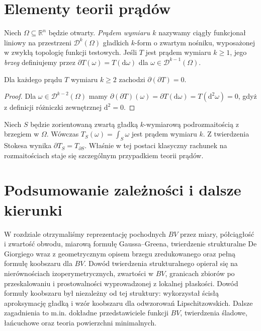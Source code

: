 \section{Elementy teorii prądów}
\begin{definicja}
\label{def:current-29}
Niech $\Omega\subseteq\mathbb R^n$ będzie otwarty.
\emph{Prądem wymiaru $k$} nazywamy ciągły
funkcjonał liniowy na przestrzeni $\mathcal D^k(\Omega)$
gładkich $k$-form o zwartym nośniku, wyposażonej
w zwykłą topologię funkcji testowych.
Jeśli $T$ jest prądem wymiaru $k\ge1$, jego
\emph{brzeg} definiujemy przez
$\partial T(\omega)=T(\mathrm d\omega)$
dla $\omega\in\mathcal D^{k-1}(\Omega)$.
\end{definicja}

\begin{lemat}
\label{lem:current-boundary-square-29}
Dla każdego prądu $T$ wymiaru $k\ge2$ zachodzi
$\partial(\partial T)=0$.
\end{lemat}
\begin{proof}
Dla $\omega\in\mathcal D^{k-2}(\Omega)$ mamy
$\partial(\partial T)(\omega)=
\partial T(\mathrm d\omega)=T(\mathrm d^2\omega)=0$,
gdyż z definicji różniczki zewnętrznej
$\mathrm d^2=0$.
\end{proof}

\begin{przyklad}
Niech $S$ będzie zorientowaną zwartą gładką
$k$-wymiarową podrozmaitością z brzegiem
w $\Omega$. Wówczas $T_S(\omega)=\int_S\omega$
jest prądem wymiaru $k$. Z twierdzenia Stokesa
wynika $\partial T_S=T_{\partial S}$. Właśnie
w tej postaci klasyczny rachunek na rozmaitościach
staje się szczególnym przypadkiem teorii prądów.
\end{przyklad}

\section{Podsumowanie zależności i dalsze kierunki}
W rozdziale otrzymaliśmy reprezentację pochodnych
$BV$ przez miary, półciągłość i zwartość obwodu,
miarową formułę Gaussa--Greena, twierdzenie strukturalne
De Giorgiego wraz z geometrycznym opisem brzegu
zredukowanego oraz pełną formułę koobszaru dla $BV$.
Dowód twierdzenia strukturalnego opierał się na
nierównościach izoperymetrycznych, zwartości w $BV$,
granicach zbiorów po przeskalowaniu i prostowalności
wyprowadzonej z lokalnej płaskości.
Dowód formuły koobszaru był niezależny od
tej struktury: wykorzystał ścisłą aproksymację
gładką i wzór koobszaru dla odwzorowań Lipschitzowskich.
Dalsze zagadnienia to m.in. dokładne przedstawiciele
funkcji $BV$, twierdzenia śladowe, łańcuchowe
oraz teoria powierzchni minimalnych.

